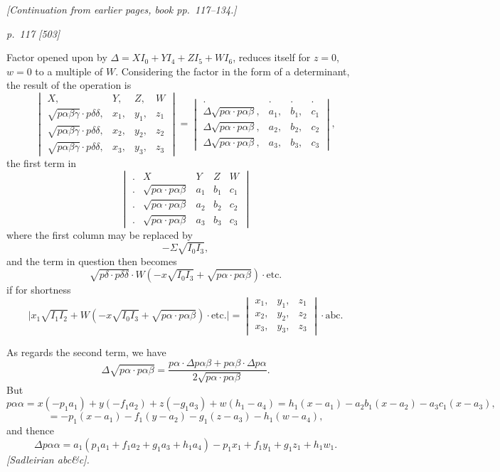 \documentclass[11pt,a4paper]{book}
\begin{document}
\begin{center}
\textit{[Continuation from earlier pages, book pp.~117--134.]}
\end{center}

\bigskip
\textit{p.~117 [503]}
\smallskip

\noindent
Factor opened upon by $\Delta = X I_0 + Y I_4 + Z I_5 + W I_6$, reduces itself for $z = 0$, $w = 0$ to a
multiple of $W$. Considering the factor in the form of a determinant, the result of the
operation is
\[
\begin{vmatrix}
X, & Y, & Z, & W \\
\sqrt{p\alpha\beta\gamma}\cdot p\delta\delta, & x_1, & y_1, & z_1 \\
\sqrt{p\alpha\beta\gamma}\cdot p\delta\delta, & x_2, & y_2, & z_2 \\
\sqrt{p\alpha\beta\gamma}\cdot p\delta\delta, & x_3, & y_3, & z_3
\end{vmatrix}
=
\begin{vmatrix}
. & . & . & . \\
\Delta\sqrt{p\alpha\cdot p\alpha\beta}, & a_1, & b_1, & c_1 \\
\Delta\sqrt{p\alpha\cdot p\alpha\beta}, & a_2, & b_2, & c_2 \\
\Delta\sqrt{p\alpha\cdot p\alpha\beta}, & a_3, & b_3, & c_3
\end{vmatrix},
\]
the first term in
\[
\begin{vmatrix}
. & X & Y & Z & W \\
. & \sqrt{p\alpha\cdot p\alpha\beta} & a_1 & b_1 & c_1 \\
. & \sqrt{p\alpha\cdot p\alpha\beta} & a_2 & b_2 & c_2 \\
. & \sqrt{p\alpha\cdot p\alpha\beta} & a_3 & b_3 & c_3
\end{vmatrix}
\]
where the first column may be replaced by
\[
-\Sigma\sqrt{I_0 I_3},
\]
and the term in question then becomes
\[
\sqrt{p\delta\cdot p\delta\delta} \cdot W (-x \sqrt{I_0 I_3} + \sqrt{p\alpha\cdot p\alpha\beta})
\cdot \text{etc.}
\]
if for shortness
\[
\bigl| x_1 \sqrt{I_1 I_2} + W (-x \sqrt{I_0 I_3} + \sqrt{p\alpha\cdot p\alpha\beta}) \cdot \text{etc.} \bigr|
=
\begin{vmatrix}
x_1, & y_1, & z_1 \\
x_2, & y_2, & z_2 \\
x_3, & y_3, & z_3
\end{vmatrix}
\cdot \text{abc}.
\]

As regards the second term, we have
\[
\Delta \sqrt{p\alpha\cdot p\alpha\beta} = \frac{p\alpha\cdot\Delta p\alpha\beta + p\alpha\beta\cdot\Delta p\alpha}{2\sqrt{p\alpha\cdot p\alpha\beta}}.
\]
But
\[
p\alpha\alpha = x (-p_1 a_1) + y (-f_1 a_2) + z (-g_1 a_3) + w (h_1 - a_4) = h_1(x - a_1) - a_2 b_1(x - a_2) - a_3 c_1(x - a_3),
\]
\[
= -p_1(x - a_1) - f_1(y - a_2) - g_1(z - a_3) - h_1(w - a_4),
\]
and thence
\[
\Delta p\alpha\alpha = a_1(p_1 a_1 + f_1 a_2 + g_1 a_3 + h_1 a_4) - p_1 x_1 + f_1 y_1 + g_1 z_1 + h_1 w_1.
\]
\textit{[Sadleirian abc\&c].}
\end{document}
